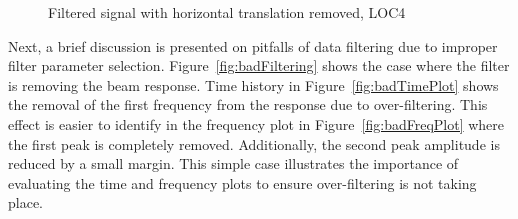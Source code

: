 \documentclass[paper=a4, fontsize=12pt]{scrartcl} %
\begin{document}
%
	\begin{figure}[H]
		\centering
		\quad
		\caption{Filtered signal with horizontal translation removed, LOC4}
		\label{fig:ShiftoutputSigFilterLOC4}
	\end{figure}
%
Next, a brief discussion is presented on pitfalls of data filtering due to improper filter parameter selection. Figure~\ref{fig:badFiltering} shows the case where the filter is removing the beam response. Time history in Figure~\ref{fig:badTimePlot} shows the removal of the first frequency from the response due to over-filtering. This effect is easier to identify in the frequency plot in Figure~\ref{fig:badFreqPlot} where the first peak is completely removed. Additionally, the second peak amplitude is reduced by a small margin. This simple case illustrates the importance of evaluating the time and frequency plots to ensure over-filtering is not taking place.
%
\end{document}
